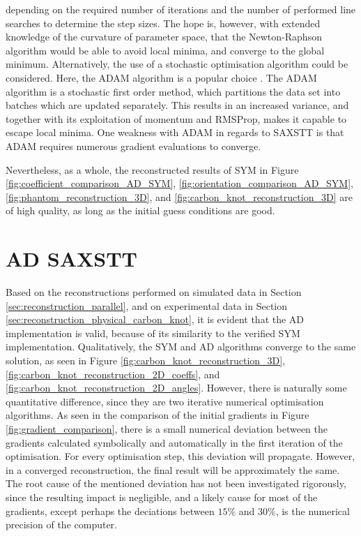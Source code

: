 depending on the required number of iterations and the number of performed line searches to determine the step sizes.
The hope is, however, with extended knowledge of the curvature of parameter space, that the Newton-Raphson algorithm would be able to avoid local minima, and converge to the global minimum.
Alternatively, the use of a stochastic optimisation algorithm could be considered. Here, the ADAM algorithm is a popular choice \cite{}. %
The ADAM algorithm is a stochastic first order method, which partitions the data set into batches which are updated separately.
This results in an increased variance, and together with its exploitation of momentum and RMSProp, makes it capable to escape local minima.
One weakness with ADAM in regards to SAXSTT is that ADAM requires numerous gradient evaluations to converge.

Nevertheless, as a whole, the reconstructed results of SYM in
Figure \ref{fig:coefficient_comparison_AD_SYM},
\ref{fig:orientation_comparison_AD_SYM},
\ref{fig:phantom_reconstruction_3D}, and
\ref{fig:carbon_knot_reconstruction_3D} are of high quality, as long as the initial guess conditions are good.




\section{AD SAXSTT}\label{sec:ad_validation}
Based on the reconstructions performed on simulated data in Section \ref{sec:reconstruction_parallel},
and on experimental data in Section \ref{sec:reconstruction_physical_carbon_knot},
it is evident that the AD implementation is valid, because of its similarity to the verified SYM implementation.
Qualitatively, the SYM and AD algorithms converge to the same solution, as seen in Figure \ref{fig:carbon_knot_reconstruction_3D}, \ref{fig:carbon_knot_reconstruction_2D_coeffs}, and \ref{fig:carbon_knot_reconstruction_2D_angles}.
However, there is naturally some quantitative difference, since they are two iterative numerical optimisation algorithms.
As seen in the comparison of the initial gradients in Figure \ref{fig:gradient_comparison},
there is a small numerical deviation between the gradients calculated symbolically and automatically in the first iteration of the optimisation.
For every optimisation step, this deviation will propagate. However, in a converged reconstruction,
the final result will be approximately the same.
The root cause of the mentioned deviation has not been investigated rigorously, since the resulting impact is negligible,
and a likely cause for most of the gradients, except perhaps the deciations between $15\%$ and $30\%$, is the numerical precision of the computer.


